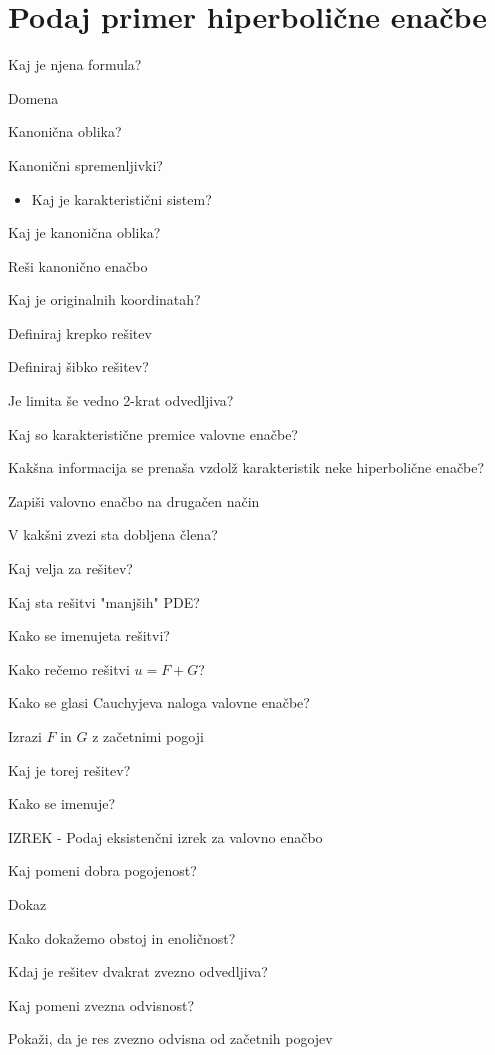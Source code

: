 \documentclass{article}
\begin{document}
    \section{Podaj primer hiperbolične enačbe}
    \begin{enumerate}
        \item Kaj je njena formula?
        \item Domena
        \item Kanonična oblika?
        \item Kanonični spremenljivki?
        \begin{itemize}
            \item Kaj je karakteristični sistem?
        \end{itemize}
        \item Kaj je kanonična oblika?   
        \item Reši kanonično enačbo
        \item Kaj je originalnih koordinatah?
        {\color{red}\item Definiraj krepko rešitev}
        {\color{red}\item Definiraj šibko rešitev?}
        \item Je limita še vedno 2-krat odvedljiva?
        \item Kaj so karakteristične premice valovne enačbe?
        {\color{red}\item Kakšna informacija se prenaša vzdolž karakteristik neke hiperbolične enačbe?}
        \item Zapiši valovno enačbo na drugačen način
        \item V kakšni zvezi sta dobljena člena?
        {\color{red}\item Kaj velja za rešitev?}
        {\color{red}\item Kaj sta rešitvi "manjših" PDE?}
        {\color{red}\item Kako se imenujeta rešitvi?}
        \item Kako rečemo rešitvi $u = F + G$?
        \item Kako se glasi Cauchyjeva naloga valovne enačbe?
        \item Izrazi $F$ in $G$ z začetnimi pogoji
        \item Kaj je torej rešitev?
        \item Kako se imenuje?
        {\color{red}\item IZREK - Podaj eksistenčni izrek za valovno enačbo}
        {\color{red}\item Kaj pomeni dobra pogojenost?}
        Dokaz
        \item Kako dokažemo obstoj in enoličnost?
        {\color{red}\item Kdaj je rešitev dvakrat zvezno odvedljiva?}
        {\color{red}\item Kaj pomeni zvezna odvisnost?}
        \item Pokaži, da je res zvezno odvisna od začetnih pogojev
    \end{enumerate}
\end{document}
